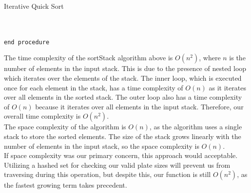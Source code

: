 \documentclass[a4paper]{article}
\begin{document}
\begin{algorithm}
\caption{Iterative Quick Sort}\label{euclid}
\begin{algorithmic}[1]
 \\
\State{}
\State{}
\State\quad{}
\State\quad{}
\State\quad\quad{}
\State\quad\quad{}
\State\quad\quad\quad {}
\State\quad\quad{}
\State\quad\quad{}
\State\quad{}
\State{}
\State{} \\
{\tt end procedure}
\EndProcedure
\end{algorithmic}
\end{algorithm}

The time complexity of the sortStack algorithm above is $O(n^2)$, 
where $n$ is the number of elements in the input stack. 
This is due to the presence of nested loop which iterates over the elements of the stack. 
The inner loop, which is executed once for each element in the stack,
has a time complexity of $O(n)$ as it iterates over all elements in the sorted stack.
The outer loop also has a time complexity of $O(n)$ because it iterates over all elements in the input stack.
Therefore, our overall time complexity is $O(n^2)$.\\

The space complexity of the algorithm is $O(n)$, as the algorithm uses a single stack to store the sorted elements.
The size of the stack grows linearly with the number of elements in the input stack, so the space complexity is $O(n)$. \\


If space complexity was our primary concern, this approach would acceptable.
Utilizing a hashed set for checking our valid plate sizes will prevent us from traversing during this operation, 
but despite this, our function is still $O(n^2)$, as the fastest growing term takes precedent. \pagebreak



\end{document}
